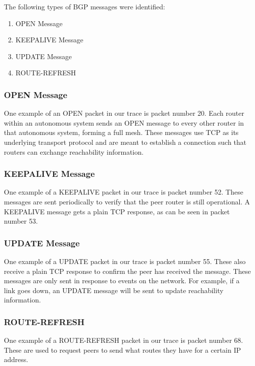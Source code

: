 The following types of BGP messages were identified:
\begin{enumerate}
    \item OPEN Message
    \item KEEPALIVE Message
    \item UPDATE Message
    \item ROUTE-REFRESH
\end{enumerate}

\subsubsection{OPEN Message}
One example of an OPEN packet in our trace is packet number 20. Each router within an autonomous system sends an OPEN message to every other router in that autonomous system, forming a full mesh. These messages use TCP as its underlying transport protocol and are meant to establish a connection such that routers can exchange reachability information.

\subsubsection{KEEPALIVE Message}
One example of a KEEPALIVE packet in our trace is packet number 52. These messages are sent periodically to verify that the peer router is still operational. A KEEPALIVE message gets a plain TCP response, as can be seen in packet number 53.

\subsubsection{UPDATE Message}
One example of a UPDATE packet in our trace is packet number 55. These also receive a plain TCP response to confirm the peer has received the message. These messages are only sent in response to events on the network. For example, if a link goes down, an UPDATE message will be sent to update reachability information. 

\subsubsection{ROUTE-REFRESH}
One example of a ROUTE-REFRESH packet in our trace is packet number 68. These are used to request peers to send what routes they have for a certain IP address.
